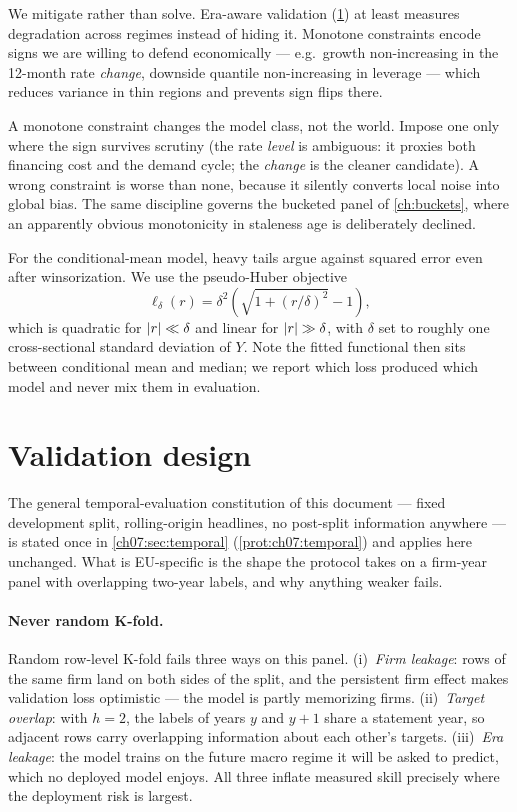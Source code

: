 We mitigate rather than solve. Era-aware validation (\cref{cheu:sec:validation}) at least
measures degradation across regimes instead of hiding it. Monotone constraints encode signs we
are willing to defend economically --- e.g.\ growth non-increasing in the 12-month rate
\emph{change}, downside quantile non-increasing in leverage --- which reduces variance in thin
regions and prevents sign flips there.

\begin{remark}\label{rem:xgb-mono}
A monotone constraint changes the model class, not the world. Impose one only where the sign
survives scrutiny (the rate \emph{level} is ambiguous: it proxies both financing cost and the
demand cycle; the \emph{change} is the cleaner candidate). A wrong constraint is worse than
none, because it silently converts local noise into global bias. The same discipline governs
the bucketed panel of \cref{ch:buckets}, where an apparently obvious monotonicity in staleness
age is deliberately declined.
\end{remark}

For the conditional-mean model, heavy tails argue against squared error even after
winsorization. We use the pseudo-Huber objective
\begin{equation}\label{eq:xgb-phuber}
\ell_\delta(r) = \delta^2\left(\sqrt{1 + (r/\delta)^2} - 1\right),
\end{equation}
which is quadratic for $\left|r\right| \ll \delta$ and linear for $\left|r\right| \gg \delta$, with $\delta$
set to roughly one cross-sectional standard deviation of $Y$. Note the fitted functional then
sits between conditional mean and median; we report which loss produced which model and never
mix them in evaluation.

\section{Validation design}\label{cheu:sec:validation}

The general temporal-evaluation constitution of this document --- fixed development split,
rolling-origin headlines, no post-split information anywhere --- is stated once in
\cref{ch07:sec:temporal} (\cref{prot:ch07:temporal}) and applies here unchanged. What is
EU-specific is the shape the protocol takes on a firm-year panel with overlapping two-year
labels, and why anything weaker fails.

\paragraph{Never random K-fold.} Random row-level K-fold fails three ways on this panel.
(i)~\emph{Firm leakage}: rows of the same firm land on both sides of the split, and the
persistent firm effect makes validation loss optimistic --- the model is partly memorizing
firms. (ii)~\emph{Target overlap}: with $h=2$, the labels of years $y$ and $y+1$ share a
statement year, so adjacent rows carry overlapping information about each other's targets.
(iii)~\emph{Era leakage}: the model trains on the future macro regime it will be asked to
predict, which no deployed model enjoys. All three inflate measured skill precisely where the
deployment risk is largest.


